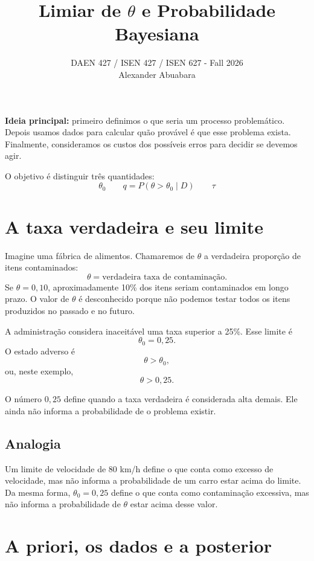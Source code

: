 \documentclass[11pt,letter]{article}
\title{\textcolor{aggiemaroon}{Limiar de $\theta$ e Probabilidade Bayesiana}}
\author{DAEN 427 / ISEN 427 / ISEN 627 - Fall 2026\\[3ex]
        Alexander Abuabara}
\date{}
\begin{document}
\maketitle

\begin{ideia}
\textbf{Ideia principal:} primeiro definimos o que seria um processo
problemático. Depois usamos dados para calcular quão provável é que esse
problema exista. Finalmente, consideramos os custos dos possíveis erros para
decidir se devemos agir.
\end{ideia}

O objetivo é distinguir três quantidades:
\[
\boxed{\theta_0\qquad q=P(\theta>\theta_0\mid D)\qquad \tau}
\]

\section{A taxa verdadeira e seu limite}

Imagine uma fábrica de alimentos. Chamaremos de $\theta$ a verdadeira
proporção de itens contaminados:
\[
\theta=\text{verdadeira taxa de contaminação}.
\]
Se $\theta=0{,}10$, aproximadamente 10\% dos itens seriam contaminados em longo
prazo. O valor de $\theta$ é desconhecido porque não podemos testar todos os
itens produzidos no passado e no futuro.

A administração considera inaceitável uma taxa superior a 25\%. Esse limite é
\[
\theta_0=0{,}25.
\]
O estado adverso é
\[
\theta>\theta_0,
\]
ou, neste exemplo,
\[
\theta>0{,}25.
\]

\begin{ideia}
O número $0{,}25$ define quando a taxa verdadeira é considerada alta demais.
Ele ainda não informa a probabilidade de o problema existir.
\end{ideia}

\subsection{Analogia}

Um limite de velocidade de 80 km/h define o que conta como excesso de
velocidade, mas não informa a probabilidade de um carro estar acima do limite.
Da mesma forma, $\theta_0=0{,}25$ define o que conta como contaminação
excessiva, mas não informa a probabilidade de $\theta$ estar acima desse valor.

\section{A priori, os dados e a posterior}
\end{document}
